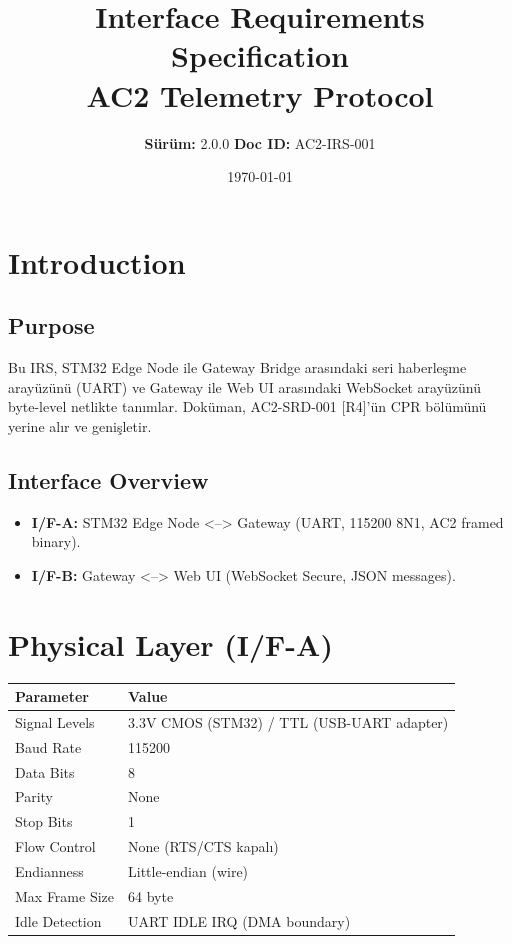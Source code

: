 \documentclass[11pt, a4paper]{article}
\title{\Huge \textbf{Interface Requirements Specification}\\
       \LARGE \textbf{AC2 Telemetry Protocol}}
\author{\Large \textbf{Sürüm:} 2.0.0 \hfill \textbf{Doc ID:} AC2-IRS-001}
\date{\today}
\begin{document}
\maketitle
\tableofcontents
\newpage

\section{Introduction}
\subsection{Purpose}
Bu IRS, STM32 Edge Node ile Gateway Bridge arasındaki seri haberleşme arayüzünü (UART) ve Gateway ile Web UI arasındaki WebSocket arayüzünü byte-level netlikte tanımlar. Doküman, AC2-SRD-001 [R4]'ün CPR bölümünü yerine alır ve genişletir.

\subsection{Interface Overview}
\begin{itemize}
    \item \textbf{I/F-A:} STM32 Edge Node <--> Gateway (UART, 115200 8N1, AC2 framed binary).
    \item \textbf{I/F-B:} Gateway <--> Web UI (WebSocket Secure, JSON messages).
\end{itemize}

\section{Physical Layer (I/F-A)}

\begin{tabularx}{\textwidth}{|l|X|}
\hline
\textbf{Parameter} & \textbf{Value} \\
\hline
Signal Levels & 3.3V CMOS (STM32) / TTL (USB-UART adapter) \\
Baud Rate & 115200 \\
Data Bits & 8 \\
Parity & None \\
Stop Bits & 1 \\
Flow Control & None (RTS/CTS kapalı) \\
Endianness & Little-endian (wire) \\
Max Frame Size & 64 byte \\
Idle Detection & UART IDLE IRQ (DMA boundary) \\
\hline
\end{tabularx}
\end{document}
